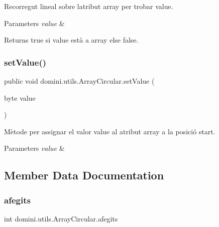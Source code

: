 Recorregut lineal sobre l\textquotesingle{}atribut array per trobar value. 


\begin{DoxyParams}{Parameters}
{\em value} & \\
\hline
\end{DoxyParams}
\begin{DoxyReturn}{Returns}
true si value està a array else false. 
\end{DoxyReturn}
\mbox{\label{classdomini_1_1utils_1_1ArrayCircular_a29e48f57c422739fff65e1f5d14c72c2}} 
\subsubsection{\texorpdfstring{set\+Value()}{setValue()}}
{\footnotesize\ttfamily public void domini.\+utils.\+Array\+Circular.\+set\+Value (\begin{DoxyParamCaption}\item[{byte}]{value }\end{DoxyParamCaption})\hspace{0.3cm}{\ttfamily [inline]}}



Mètode per assignar el valor value al atribut array a la posició start. 


\begin{DoxyParams}{Parameters}
{\em value} & \\
\hline
\end{DoxyParams}


\subsection{Member Data Documentation}
\mbox{\label{classdomini_1_1utils_1_1ArrayCircular_a08291d877b2d4c71c219df6f983b279a}} 
\subsubsection{\texorpdfstring{afegits}{afegits}}
{\footnotesize\ttfamily int domini.\+utils.\+Array\+Circular.\+afegits\hspace{0.3cm}{\ttfamily [private]}}


